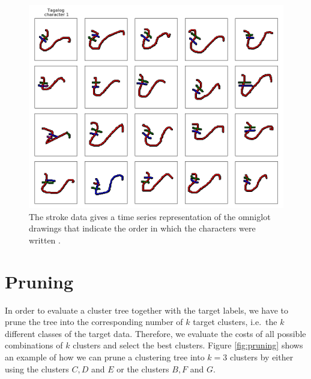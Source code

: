 \begin{figure}[h]
  \centering
  \includegraphics[width=.6\textwidth]{plots/demo_strokes}
  \caption{The stroke data gives a time series representation of the omniglot drawings that indicate the order in which the characters were written \cite{Lake1332}.}
  \label{fig:omniglotstroke}
\end{figure}

\section{Pruning}

In order to evaluate a cluster tree together with the target labels, we have to prune the tree into the corresponding number of $k$ target clusters, i.e.\ the $k$ different classes of the target data. Therefore, we evaluate the costs of all possible combinations of $k$ clusters and select the best clusters. Figure \ref{fig:pruning} shows an example of how we can prune a clustering tree into $k = 3$ clusters by either using the clusters $C, D$ and $E$ or the clusters $B, F$ and $G$.

